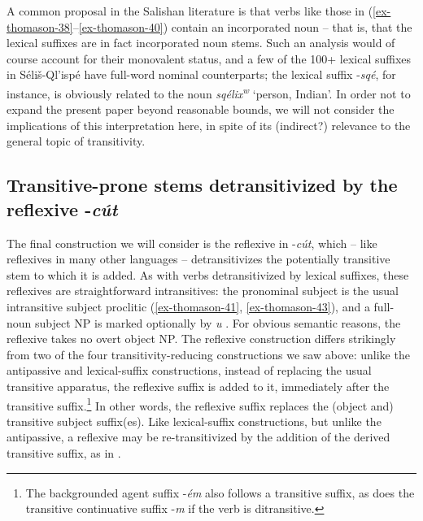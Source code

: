 \documentclass[output=paper,colorlinks,citecolor=brown]{langscibook}
\begin{document}
A common proposal in the Salishan literature is that verbs like those
in (\ref{ex-thomason-38}--\ref{ex-thomason-40}) contain an incorporated noun -- that is, that the lexical
suffixes are in fact incorporated noun stems.  Such an analysis would
of course account for their monovalent status, and a few of the 100+
lexical suffixes in S\'eli\v{s}-Ql'isp\'e have full-word nominal
counterparts; the lexical suffix -\emph{sq\'e}, for instance, is
obviously related to the noun \emph{sq\'elix\textsuperscript w}
`person, Indian'.  In order not to expand the present paper beyond
reasonable bounds, we will not consider the implications of this
interpretation here, in spite of its (indirect?) relevance to the
general topic of transitivity.

\subsection{Transitive-prone stems detransitivized by the reflexive
 -\emph{c\'ut}}   %
\label{thomason_section_2.9}

The final construction we will consider is the reflexive in
-\emph{c\'ut}, which -- like reflexives in many other
languages -- detransitivizes the potentially transitive stem to which
it is added.  As with verbs detransitivized by lexical suffixes, these
reflexives are straightforward intransitives: the pronominal subject
is the usual intransitive subject proclitic (\ref{ex-thomason-41}, \ref{ex-thomason-43}), and a full-noun
subject NP is marked optionally by \emph{{\textltilde}u} .  For
obvious semantic reasons, the reflexive takes no overt object NP.  The
reflexive construction differs strikingly from two of the four
transitivity-reducing constructions we saw above: unlike the
antipassive and lexical-suffix constructions, instead of replacing the
usual transitive apparatus, the reflexive suffix is added to it,
immediately after the transitive suffix.\footnote{The backgrounded
agent suffix -\emph{\'em} also follows a transitive suffix, as does
the transitive continuative suffix -\emph{m} if the verb is
ditransitive.}  In other words, the reflexive suffix replaces the
(object and) transitive subject suffix(es).  Like lexical-suffix
constructions, but unlike the antipassive, a reflexive may be
re-transitivized by the addition of the derived transitive suffix, as
in .
\end{document}
